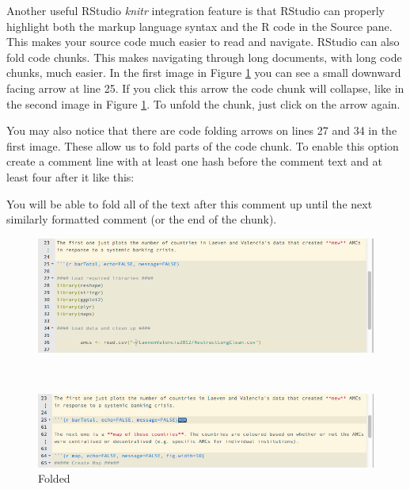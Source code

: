 \documentclass[krantz1]{krantz}
\begin{document}
Another useful RStudio {\emph{knitr}} integration feature is that RStudio can properly highlight both the markup language syntax and the R code in the Source pane. This makes your source code much easier to read and navigate. RStudio can also fold code chunks. This makes navigating through long documents, with long code chunks, much easier. In the first image in Figure \ref{CodeFold} you can see a small downward facing arrow at line 25. If you click this arrow the code chunk will collapse, like in the second image in Figure \ref{CodeFold}. To unfold the chunk, just click on the arrow again.

You may also notice that there are code folding arrows on lines 27 and 34 in the first image. These allow us to fold parts of the code chunk. To enable this option create a comment line with at least one hash before the comment text and at least four after it like this:

\begin{knitrout}
\color{fgcolor}\begin{kframe}
\begin{alltt}
\end{alltt}
\end{kframe}
\end{knitrout}


\noindent You will be able to fold all of the text after this comment up until the next similarly formatted comment (or the end of the chunk).

\begin{figure}[ht!]
    \caption{Folding Code Chunks in RStudio}
    \label{CodeFold}
    \setlength{\belowcaptionskip}{5pt}
    \centering    
    \begin{subfigure}  
        \caption{Not Folded}   
        \includegraphics[width = \textwidth]{Children/Chapter3/images3/MarkdownNoCollapse.png}
    \end{subfigure} \\[0.5cm]
    
    \begin{subfigure}
        \caption{Folded}
        \includegraphics[width = \textwidth]{Children/Chapter3/images3/MarkdownCollapse.png}        
    \end{subfigure}
\end{figure}
\end{document}
